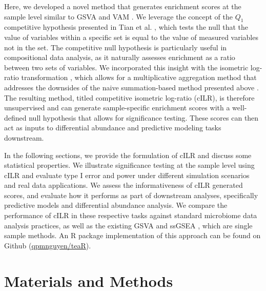 \documentclass[10pt,letterpaper]{article}
\begin{document}
Here, we developed a novel method that generates enrichment scores at the sample level similar to GSVA \cite{hanzelmann2013} and VAM \cite{frost2020a}. We leverage the concept of the $Q_1$ competitive hypothesis presented in Tian et al. \cite{tian2005}, which tests the null that the value of variables within a specific set is equal to the value of measured variables not in the set. The competitive null hypothesis is particularly useful in compositional data analysis, as it naturally assesses enrichment as a ratio between two sets of variables. We incorporated this insight with the isometric log-ratio transformation \cite{egozcue2003}, which allows for a multiplicative aggregation method that addresses the downsides of the naive summation-based method presented above \cite{mclaren2019, silverman2017}. The resulting method, titled competitive isometric log-ratio (cILR), is therefore unsupervised and can generate sample-specific enrichment scores with a well-defined null hypothesis that allows for significance testing. These scores can then act as inputs to differential abundance and predictive modeling tasks downstream. 

In the following sections, we provide the formulation of cILR and discuss some statistical properties. We illustrate significance testing at the sample level using cILR and evaluate type I error and power under different simulation scenarios and real data applications. We assess the informativeness of cILR generated scores, and evaluate how it performs as part of downstream analyses, specifically predictive models and differential abundance analysis. We compare the performance of cILR in these respective tasks against standard microbiome data analysis practices, as well as the existing GSVA \cite{hanzelmann2013} and ssGSEA \cite{barbie2009}, which are single sample methods. An R package implementation of this approach can be found on Github (\href{www.github.com/qpmnguyen/teaR}{qpmnguyen/teaR}).

\section*{Materials and Methods} \label{methods}
\end{document}

